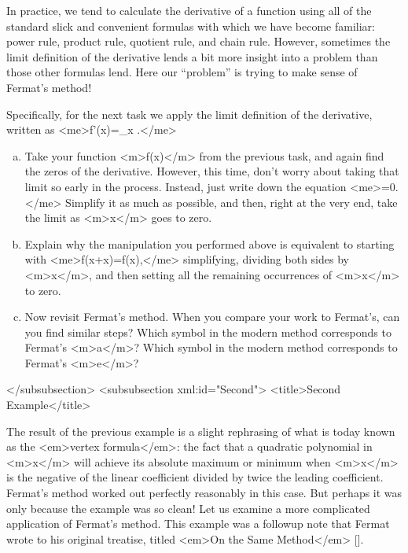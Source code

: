 \begin{refsection}
\begin{task}
\end{task}

In practice, we tend to calculate the derivative of a function using
all of the standard slick and convenient formulas with which we have
become familiar: power rule, product rule, quotient rule, and chain
rule.  However, sometimes the limit definition of the derivative lends
a bit more insight into a problem than those other formulas lend.
Here our ``problem'' is trying to make sense of Fermat's method!

Specifically, for the next task we apply the limit definition of the
derivative, written as
<me>f'(x)=\lim_{\Delta x } .</me>

\begin{task}
\begin{enumerate}[(a)]\label{comparison}
\item Take your function <m>f(x)</m> from the previous task, and again find
  the zeros of the derivative.  However, this time, don't worry about
  taking that limit so early in the process.  Instead, just write down
  the equation <me>=0.</me> Simplify it
  as much as possible, and then, right at the very end, take the limit
  as <m>\Delta x</m> goes to zero.
    
\item Explain why the manipulation you performed above is equivalent
  to starting with <me>f(x+\Delta x)=f(x),</me> simplifying, dividing both
  sides by <m>\Delta x</m>, and then setting all the remaining occurrences
  of <m>\Delta x</m> to zero.
    
\item Now revisit Fermat's method.  When you compare your work to
  Fermat's, can you find similar steps?  Which symbol in the modern
  method corresponds to Fermat's <m>a</m>?  Which symbol in the modern
  method corresponds to Fermat's <m>e</m>?
\end{enumerate}
\end{task}


</subsubsection>
<subsubsection xml:id="Second">
<title>Second Example</title>

The result of the previous example is a slight rephrasing of what is
today known as the <em>vertex formula</em>: the fact that a quadratic
polynomial in <m>x</m> will achieve its absolute maximum or minimum when
<m>x</m> is the negative of the linear coefficient divided by twice the
leading coefficient.  Fermat's method worked out perfectly reasonably
in this case.  But perhaps it was only because the example was so
clean!  Let us examine a more complicated application of Fermat's
method.  This example was a followup note that Fermat wrote to his
original treatise, titled <em>On the Same Method</em> [\cite[page
126]{Tannery}].


\end{refsection}
